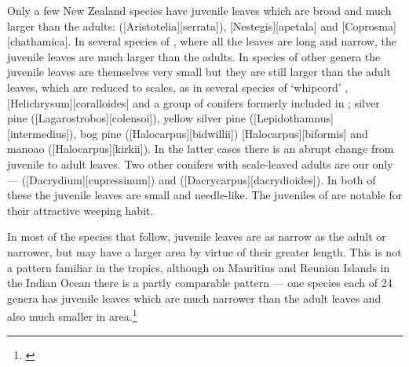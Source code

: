 Only a few New Zealand species have juvenile leaves which are broad and much larger than the adults:  ([Aristotelia][serrata]), [Nestegis][apetala] and [Coprosma][chathamica].
In several species of , where all the leaves are long and narrow, the juvenile leaves are much larger than the adults.
In species of other genera the juvenile leaves are themselves very small but they are still larger than the adult leaves, which are reduced to scales, as in several species of `whipcord' , [Helichrysum][coralloides] and a group of conifers formerly included in ; silver pine ([Lagarostrobos][colensoi]), yellow silver pine ([Lepidothamnus][intermedius]), bog pine ([Halocarpus][bidwillii]) [Halocarpus][biformis] and manoao ([Halocarpus][kirkii]).
In the latter cases there is an abrupt change from juvenile to adult leaves.
Two other conifers with scale-leaved adults are our only  ---  ([Dacrydium][cupressinum]) and  ([Dacrycarpus][dacrydioides]).
In both of these the juvenile leaves are small and needle-like.
The juveniles of  are notable for their attractive weeping habit.

In most of the species that follow, juvenile leaves are as narrow as the adult or narrower, but may have a larger area by virtue of their greater length.
This is not a pattern familiar in the tropics, although on Mauritius and Reunion Islands in the Indian Ocean there is a partly comparable pattern --- one species each of 24 genera has juvenile leaves which are much narrower than the adult leaves and also much smaller in area.\footnote{\cite{friedmann1976observations}}

